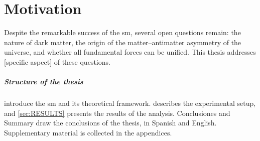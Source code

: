 \documentclass[../../thesis.tex]{subfiles}
\begin{document}
\chapter*{Motivation}
\label{sec:MOTIVATION}

Despite the remarkable success of the \gls{sm}, several open questions remain: the nature of dark matter, the origin of the matter--antimatter asymmetry of the universe, and whether all fundamental forces can be unified. This thesis addresses [specific aspect] of these questions.

\paragraph{Structure of the thesis}  introduce the \gls{sm} and its theoretical framework.  describes the experimental setup, and \cref{sec:RESULTS} presents the results of the analysis. Conclusiones and Summary draw the conclusions of the thesis, in Spanish and English. Supplementary material is collected in the appendices.

\end{document}
